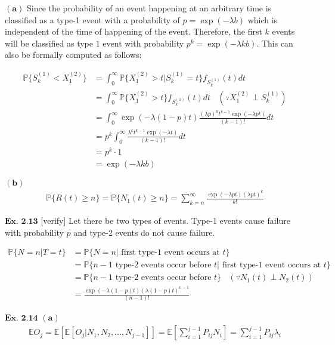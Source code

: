 \documentclass{article}
\begin{document}
$\mathbf{(a)}$
Since the probability of an event happening at an arbitrary time is classified as a type-1 event with a probability of $p = \exp(-\lambda b)$ which is independent of the time of happening of the event. Therefore, the first $k$ events will be classified as type $1$ event with probability $p^k = \exp(-\lambda k b)$. This can also be formally computed as follows:

\begin{align*}
\mathbb{P}\{S_{k}^{(1)} < X_1^{(2)}\} &= \int_{0}^{\infty}\mathbb{P}\{X_{1}^{(2)} > t|S_{k}^{(1)} = t\}f_{S_{k}^{(1)}}(t) dt\\
&= \int_{0}^{\infty}\mathbb{P}\{X_{1}^{(2)} > t\}f_{S_{k}^{(1)}}(t) dt\ \ \ \ (\because X_1^{(2)} \perp S_{k}^{(1)})\\
&= \int_{0}^{\infty}\exp(-\lambda (1-p)t) \frac{(\lambda p)^kt^{k-1}\exp(-\lambda pt)}{(k-1)!}dt\\
&= p^k\int_{0}^{\infty}\frac{\lambda^kt^{k-1}\exp(-\lambda t)}{(k-1)!}dt\\
&= p^k \cdot 1\\
&= \exp(-\lambda kb)
\end{align*}

$\mathbf{(b)}$
\begin{align*}
\mathbb{P}\{R(t) \geq n\} = \mathbb{P}\{N_1(t)\geq n\} = \sum_{k=n}^{\infty}\frac{\exp(-\lambda p t)(\lambda p t)^k}{k!}
\end{align*}


\vspace{0.2in}
${\textbf{Ex. 2.13}}$
[verify] Let there be two types of events. Type-1 events cause failure with probability $p$ and type-2 events do not cause failure.

\begin{align*}
\mathbb{P}\{N = n|T= t\} &= \mathbb{P}\{N = n| \text{ first type-1 event occurs at }t\}\\
&= \mathbb{P}\{n-1 \text{ type-2 events occur before }t| \text{ first type-1 event occurs at }t\}\\
&= \mathbb{P}\{n-1 \text{ type-2 events occur before }t\} \ \ \ \ (\because N_1(t) \perp N_2(t))\\
&= \frac{\exp(-\lambda(1-p)t)(\lambda(1-p)t)^{n-1}}{(n-1)!}
\end{align*}

\vspace{0.2in}
${\textbf{Ex. 2.14}}$
$\mathbf{(a)}$
\begin{align*}
\mathbb{E}O_j = \mathbb{E}[\mathbb{E}[O_j|N_1,N_2,\ldots,N_{j-1}]] = \mathbb{E}\left[\sum_{i=1}^{j-1}P_{ij}N_i\right] = \sum_{i=1}^{j-1}P_{ij}\lambda_i
\end{align*}
\end{document}
